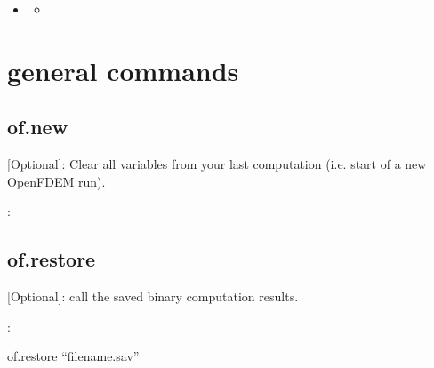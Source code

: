 \documentclass[letterpaper,10pt,english]{sphinxmanual}
\begin{document}
\begin{sphinxShadowBox}
\begin{itemize}
\begin{itemize}
\end{itemize}

\item {} 
\label{\detokenize{rst_tutorials/command_line_guide:id115}}{\hyperref[\detokenize{rst_tutorials/command_line_guide:seismic}]{}}
\begin{itemize}
\item {} 
\label{\detokenize{rst_tutorials/command_line_guide:id116}}{\hyperref[\detokenize{rst_tutorials/command_line_guide:of-seismic-window-value}]{}}

\end{itemize}

\end{itemize}
\end{sphinxShadowBox}


\chapter{general commands}
\label{\detokenize{rst_tutorials/command_line_guide:general-commands}}\label{\detokenize{rst_tutorials/command_line_guide::doc}}

\section{of.new}
\label{\detokenize{rst_tutorials/command_line_guide:of-new}}
 {[}Optional{]}: Clear all variables from your last computation (i.e. start of a new OpenFDEM run).

:

\begin{sphinxVerbatim}[commandchars=\\\{\}]
\end{sphinxVerbatim}


\section{of.restore}
\label{\detokenize{rst_tutorials/command_line_guide:of-restore}}
 {[}Optional{]}: call the saved binary computation results.

:

\begin{sphinxVerbatim}[commandchars=\\\{\}]
of.restore “filename.sav”
\end{sphinxVerbatim}
\end{document}
